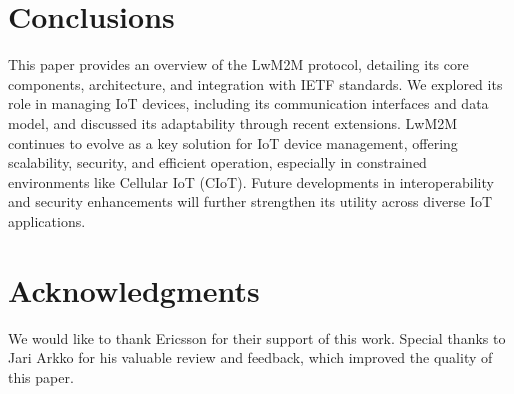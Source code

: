 \documentclass[11pt,sigconf]{iabart}
\begin{document}
\section{Conclusions} \label{conclusions}

This paper provides an overview of the LwM2M protocol, detailing its core components, architecture, and integration with IETF standards. We explored its role in managing IoT devices, including its communication interfaces and data model, and discussed its adaptability through recent extensions. LwM2M continues to evolve as a key solution for IoT device management, offering scalability, security, and efficient operation, especially in constrained environments like Cellular IoT (CIoT). Future developments in interoperability and security enhancements will further strengthen its utility across diverse IoT applications.


\section{Acknowledgments}

We would like to thank Ericsson for their support of this work. Special thanks to Jari Arkko for his valuable review and feedback, which improved the quality of this paper.



\end{document}
